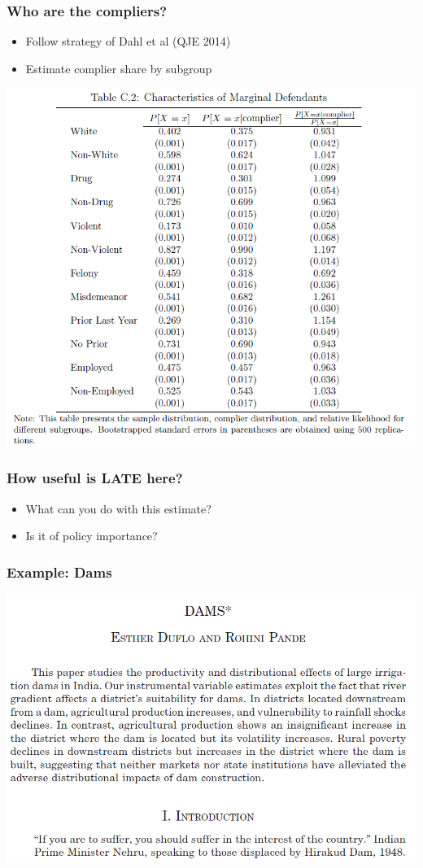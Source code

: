 \begin{frame}
  \frametitle{Who are the compliers?}
  \begin{itemize}
    \item Follow strategy of Dahl et al (QJE 2014)
    \item Estimate complier share by subgroup
   \end{itemize}
   \includegraphics[height=.8\textheight]{./resources/DobbieComplierStats} 
\end{frame}

\begin{frame}
  \frametitle{How useful is LATE here?}
  \begin{itemize}
    \item What can you do with this estimate?
    \item Is it of policy importance?
   \end{itemize}
\end{frame}

\begin{frame}
  \frametitle{Example: Dams}
  \begin{center}
    \includegraphics[width=.9\textwidth]{./resources/DamsAbstract}
  \end{center}  
\end{frame}

